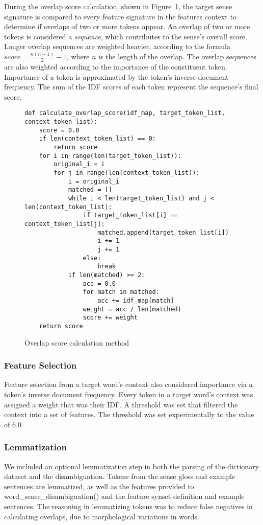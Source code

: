 \documentclass[11pt]{article}
\begin{document}
During the overlap score calculation, shown in Figure~\ref{overlap}, the target sense signature is compared to every feature signature in the features context to determine if overlaps of two or more tokens appear. An overlap of two or more tokens is considered a \textit{sequence}, which contributes to the sense's overall score. Longer overlap sequences are weighted heavier, according to the formula $score = \frac{n(n+1)}{2} - 1$, where $n$ is the length of the overlap. The overlap sequences are also weighted according to the importance of the constituent token. Importance of a token is approximated by the token's inverse document frequency. The sum of the IDF scores of each token represent the sequence's final score.

\begin{figure}[ht]
\begin{lstlisting}
def calculate_overlap_score(idf_map, target_token_list, context_token_list):
    score = 0.0
    if len(context_token_list) == 0:
        return score
    for i in range(len(target_token_list)):
        original_i = i
        for j in range(len(context_token_list)):
            i = original_i
            matched = []
            while i < len(target_token_list) and j < len(context_token_list):
                if target_token_list[i] == context_token_list[j]:
                    matched.append(target_token_list[i])
                    i += 1
                    j += 1
                else:
                    break
            if len(matched) >= 2:
                acc = 0.0
                for match in matched:
                    acc += idf_map[match]
                weight = acc / len(matched)
                score += weight
    return score
\end{lstlisting}
\caption{Overlap score calculation method}
\label{overlap}
\end{figure}

\subsubsection{Feature Selection}
Feature selection from a target word's context also considered importance via a token's inverse document frequency. Every token in a target word's context was assigned a weight that was their IDF. A threshold was set that filtered the context into a set of features. The threshold was set experimentally to the value of $6.0$.

\subsubsection{Lemmatization}
We included an optional lemmatization step in both the parsing of the dictionary dataset and the disambiguation. Tokens from the sense gloss and example sentences are lemmatized, as well as the features provided to word\_sense\_disambiguation() and the feature synset definition and example sentences. The reasoning in lemmatizing tokens was to reduce false negatives in calculating overlaps, due to morphological variations in words.
\end{document}
